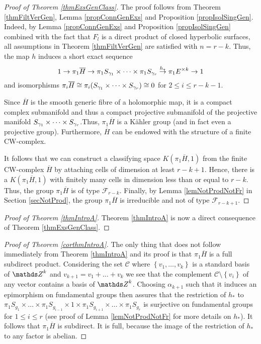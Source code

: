 \begin{proof}[Proof of Theorem \ref{thmExsGenClass}]
 The proof follows from Theorem \ref{thmFiltVerGen}, Lemma \ref{propConnGenExs}  and Proposition \ref{propIsolSingGen}. Indeed, by Lemma \ref{propConnGenExs} and Proposition \ref{propIsolSingGen} combined with the fact that $F_l$ is a direct product of closed hyperbolic surfaces, all assumptions in Theorem \ref{thmFiltVerGen} are satisfied with $n=r-k$. Thus, the map $h$ induces a short exact sequence 
 \[
  1\rightarrow \pi_1 \overline{H}\rightarrow \pi_1 S_{\gamma_1}\times \cdots \times \pi_1 S_{\gamma_r} \stackrel{h_{\ast}}{\rightarrow} \pi_1 E^{\times k} \rightarrow 1 
 \]
 and isomorphisms $\pi_i \overline{H} \cong \pi_i (S_{\gamma_1}\times \cdots \times S_{\gamma_r})\cong 0$ for $2\leq i \leq r-k-1$.
 
 Since $\overline{H}$ is the smooth generic fibre of a holomorphic map, it is a compact complex submanifold and thus a compact projective submanifold of the projective manifold $S_{\gamma_1}\times \dots \times S_{\gamma_r}$.Thus, $\pi_1\overline{H}$ is a K\"ahler group (and in fact even a projective group). Furthermore, $\overline{H}$ can be endowed with the structure of a finite CW-complex.
 
 It follows that we can construct a classifying space $K(\pi_1\overline{H},1)$ from the finite CW-complex $\overline{H}$ by attaching cells of dimension at least $r-k+1$. Hence, there is a $K(\pi_1 \overline{H},1)$ with finitely many cells in dimension less than or equal to $r-k$. Thus, the group $\pi_1 \overline{H}$ is of type $\mathcal{F}_{r-k}$. Finally, by Lemma \ref{lemNotProdNotFr} in Section \ref{secNotProd}, the group $\pi_1 \overline{H}$ is irreducible and not of type $\mathcal{F}_{r-k+1}$.
\end{proof}

\begin{proof}[Proof of Theorem \ref{thmIntroA}]
Theorem \ref{thmIntroA} is now a direct consequence of Theorem \ref{thmExsGenClass}.
\end{proof}

 \begin{proof}[Proof of Theorem \ref{corthmIntroA}] 
 The only thing that does not follow immediately from Theorem \ref{thmIntroA} and its proof is that $\pi_1 \overline{H}$ is a full subdirect product. Considering the set $\mathcal{C}$ where $\left\{v_1,\dots,v_k\right\}$ is a standard basis of $\ZZ^k$ and $v_{k+1}=v_1+\dots +v_k$ we see that the complement $\mathcal{C}\setminus \left\{v_i\right\}$ of any vector contains a basis of $\ZZ^k$. Choosing $\alpha_{k+1}$ such that it induces an epimorphism on fundamental groups then assures that the restriction of $h_{\ast}$ to $\pi_1 S_{g_1}\times \dots \times \pi_1 S_{g_{i-1}}\times 1 \times \pi_1 S_{g_{i+1}}\times \dots \times \pi_1 S_{g_r}$ is surjective on fundamental groups for $1\leq i \leq r$ (see proof of Lemma \ref{lemNotProdNotFr} for more details on $h_{\ast}$). It follows that $\pi_1\overline{H}$ is subdirect. It is full, because the image of the restriction of $h_{\ast}$ to any factor is abelian.
 \end{proof}

